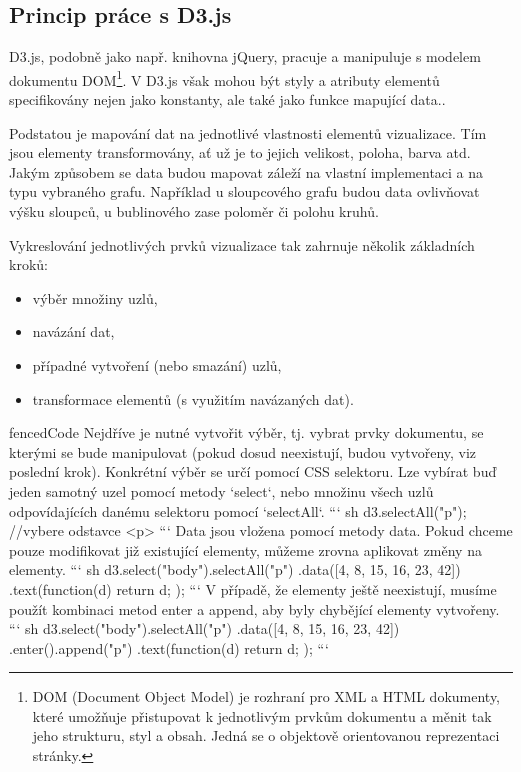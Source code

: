 \documentclass[
  digital, %
  oneside, %
  table,   %
  nolof,     %
  nolot,     %
]{fithesis3}
\begin{document}
\subsection{Princip práce s D3.js}
D3.js, podobně jako např. knihovna jQuery, pracuje a manipuluje s modelem dokumentu DOM\footnote{DOM (Document Object Model) je rozhraní pro XML a HTML dokumenty, které umožňuje přistupovat k jednotlivým prvkům dokumentu a měnit tak jeho strukturu, styl a obsah. Jedná se o objektově orientovanou reprezentaci stránky.}. V D3.js však mohou být styly a atributy elementů specifikovány nejen jako konstanty, ale také jako funkce mapující data.\cite{d3jsorg}.\par
Podstatou je mapování dat na jednotlivé vlastnosti elementů vizualizace. Tím jsou elementy transformovány, ať už je to jejich velikost, poloha, barva atd. Jakým způsobem se data budou mapovat záleží na vlastní implementaci a na typu vybraného grafu. Například u sloupcového grafu budou data ovlivňovat výšku sloupců, u bublinového zase poloměr či polohu kruhů. \cite{interactiveVisualizationBook}\par
Vykreslování jednotlivých prvků vizualizace tak zahrnuje několik základních kroků:
\begin{itemize}
  \item výběr množiny uzlů,
  \item navázání dat,
  \item případné vytvoření (nebo smazání) uzlů,
  \item transformace elementů (s využitím navázaných dat).
\end{itemize}
\begin{markdown*}{
  fencedCode
}
Nejdříve je nutné vytvořit výběr, tj. vybrat prvky dokumentu, se kterými se bude manipulovat (pokud dosud neexistují, budou vytvořeny, viz poslední krok). Konkrétní výběr se určí pomocí CSS selektoru.
Lze vybírat buď jeden samotný uzel pomocí metody `select`, nebo množinu všech uzlů odpovídajících danému selektoru pomocí `selectAll`.
``` sh
	d3.selectAll("p");     //vybere odstavce <p>
```
Data jsou vložena pomocí metody data. Pokud chceme pouze modifikovat již existující elementy, můžeme zrovna aplikovat změny na elementy.
``` sh
	d3.select("body").selectAll("p")
		.data([4, 8, 15, 16, 23, 42])
		.text(function(d) { return d; });
```
V případě, že elementy ještě neexistují, musíme použít kombinaci metod enter a append, aby byly chybějící elementy vytvořeny.
``` sh
	d3.select("body").selectAll("p")
		.data([4, 8, 15, 16, 23, 42])
		.enter().append("p")
		.text(function(d) { return d; });
```
\end{markdown*}
\end{document}
